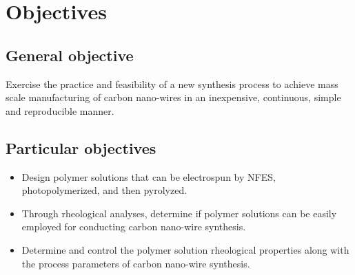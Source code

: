 
\chapter{Objectives} %

\label{Chapter:Objectives}

\section{General objective}
Exercise the practice and feasibility of a new synthesis process to achieve mass scale manufacturing of carbon nano-wires in an inexpensive, continuous, simple and reproducible manner.

\section{Particular objectives}

\begin{itemize}
	\item{
	Design polymer solutions that can be electrospun by NFES, photopolymerized, and then pyrolyzed.
    }
    \item{
    Through rheological analyses, determine if polymer solutions can be easily employed for conducting carbon nano-wire synthesis.
    }
    \item{
    Determine and control the polymer solution rheological properties along with the process parameters of carbon nano-wire synthesis.
    }
\end{itemize}




